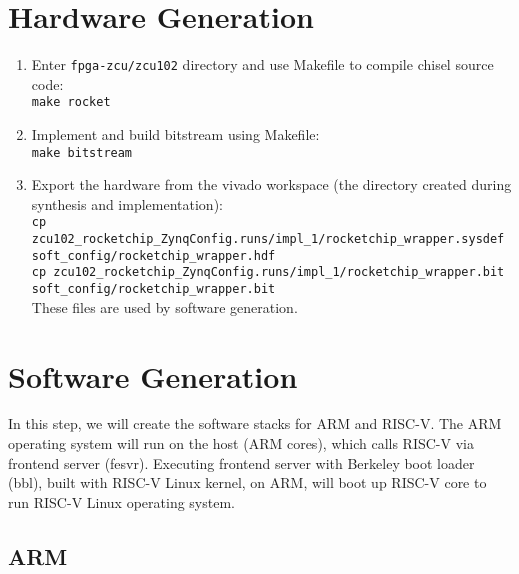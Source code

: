 \documentclass[a4paper,11pt]{article}
\begin{document}
\section{Hardware Generation}
\begin{enumerate}
\item Enter  {\tt fpga-zcu/zcu102} directory and use Makefile to compile chisel source code:\\
{\tt make rocket}
\item Implement and build bitstream using Makefile:\\
 {\tt make bitstream}
\item Export the hardware from the vivado workspace (the directory created during synthesis and implementation):\\
{\tt cp zcu102\_rocketchip\_ZynqConfig.runs/impl\_1/rocketchip\_wrapper.sysdef soft\_config/rocketchip\_wrapper.hdf}\\
{\tt cp zcu102\_rocketchip\_ZynqConfig.runs/impl\_1/rocketchip\_wrapper.bit soft\_config/rocketchip\_wrapper.bit}\\
These files are used by software generation.
\end{enumerate}

\section{Software Generation}
In this step, we will create the software stacks for ARM and RISC-V. The ARM operating system will run on the host (ARM cores), which calls RISC-V via frontend server (fesvr). Executing frontend server with Berkeley boot loader (bbl), built with RISC-V Linux kernel, on ARM, will boot up RISC-V core to run RISC-V Linux operating system.  

\subsection{ARM}\label{sec-arm}
\end{document}
